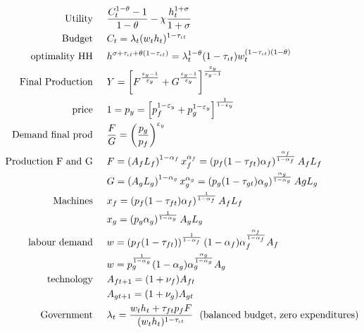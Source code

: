 \begin{align}
\text{Utility}\hspace{5mm}& \frac{C_t^{1-\theta}-1}{1-\theta}-\chi \frac{h_t^{1+\sigma}}{1+\sigma}\\
\text{Budget}\hspace{5mm}& C_t = \lambda_t(w_th_t)^{1-\tau_{\iota t}}\\
\text{optimality HH}\hspace{5mm}& h^{\sigma+\tau_{\iota t}+\theta(1-\tau_{\iota t})}=\lambda_t^{1-\theta}(1-\tau_{\iota t})w_t^{(1-\tau_{\iota t})(1-\theta)}\\
\text{Final Production}\hspace{5mm}&Y= \left[F^\frac{\varepsilon_y-1}{\varepsilon_y}+G^\frac{\varepsilon_y-1}{\varepsilon_y}\right]^\frac{\varepsilon_y}{\varepsilon_y-1}\\
\text{price}\hspace{5mm}&1=p_y= \left[p_f^{1-\varepsilon_y}+p_g^{1-\varepsilon_y}\right]^\frac{1}{1-\varepsilon_y}\\
\text{Demand final prod}\hspace{5mm}&\frac{F}{G}=\left(\frac{p_g}{p_f}\right)^{\varepsilon_y}\\
\text{Production F and G}\hspace{5mm}&F=\left(A_fL_f\right)^{1-\alpha_f}x_f^{\alpha_f}=\left(p_f(1-\tau_{ft})\alpha_f\right)^\frac{\alpha_f}{1-\alpha_f}A_fL_f\\
& G=\left(A_gL_g\right)^{1-\alpha_g}x_g^{\alpha_g}=\left(p_g(1-\tau_{gt})\alpha_g\right)^\frac{\alpha_g}{1-\alpha_g}AgL_g\\
\text{Machines}\hspace{5mm}& x_f=\left(p_f(1-\tau_{ft})\alpha_f\right)^\frac{1}{1-\alpha_f}A_fL_f\\
& x_g=\left(p_g\alpha_g\right)^\frac{1}{1-\alpha_g}A_gL_g\\
\text{labour demand}\hspace{5mm}& w=\left(p_f(1-\tau_{ft})\right)^\frac{1}{1-\alpha_f}(1-\alpha_f)\alpha_f^{\frac{\alpha_f}{1-\alpha_f}}A_f\\
& w=p_g^\frac{1}{1-\alpha_g}(1-\alpha_g)\alpha_g^{\frac{\alpha_g}{1-\alpha_g}}A_g\\
\text{technology}\hspace{5mm}&A_{ft+1}=(1+\nu_f)A_{ft}\\
&A_{gt+1}=(1+\nu_g)A_{gt}\\
\text{Government}\hspace{5mm}&\lambda_t=\frac{w_t h_t+\tau_{ft}p_fF}{(w_t h_t)^{1-\tau_{\iota t}}}\ \ \text{(balanced budget, zero expenditures)}
\end{align}